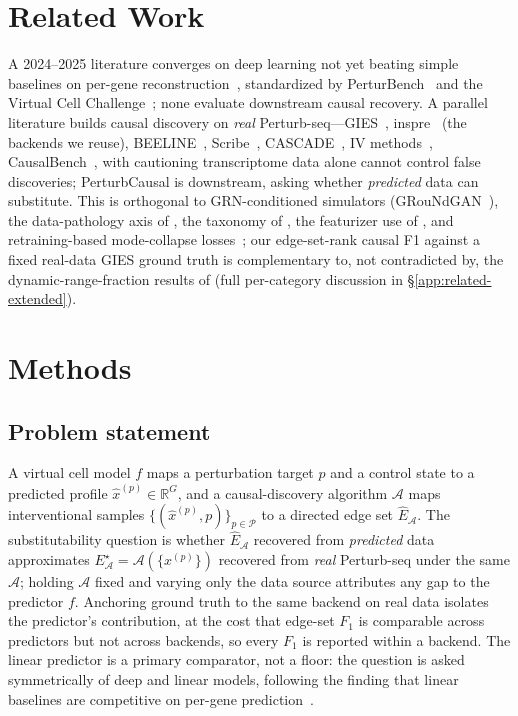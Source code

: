 \documentclass{article}
\theoremstyle{plain}
\theoremstyle{definition}
\theoremstyle{remark}
\begin{document}
\section{Related Work}
\label{sec:related}
A 2024--2025 literature converges on deep learning not yet beating simple baselines on per-gene reconstruction~\citep{ahlmanneltze2025,wong2025simple,csendes2025benchmark,wei2025benchmark,vinas2025systema,bendidi2024pca,wenteler2025perteval,zhu2025garm,li2025systematic,mejia2025diversity}, standardized by PerturBench~\citep{wu2024perturbench} and the Virtual Cell Challenge~\citep{roohani2025vcc}; none evaluate downstream causal recovery. A parallel literature builds causal discovery on \emph{real} Perturb-seq---GIES~\citep{hauser2012gies}, inspre~\citep{brown2025inspre} (the backends we reuse), BEELINE~\citep{pratapa2019beeline}, Scribe~\citep{qiu2020scribe}, CASCADE~\citep{cao2025cascade}, IV methods~\citep{park2026confounder}, CausalBench~\citep{chevalley2025causalbench}, with \citet{kernfeld2024fdr} cautioning transcriptome data alone cannot control false discoveries; PerturbCausal is downstream, asking whether \emph{predicted} data can substitute. This is orthogonal to GRN-conditioned simulators (GRouNdGAN~\citep{zinati2024groundgan}), the data-pathology axis of \citet{fernandez2026grnbreak}, the taxonomy of \citet{vc_causal_2025}, the featurizer use of \citet{wu2025cdn}, and retraining-based mode-collapse losses~\citep{mejia2025diversity}; our edge-set-rank causal F1 against a fixed real-data GIES ground truth is complementary to, not contradicted by, the dynamic-range-fraction results of \citet{miller2025calibrated} (full per-category discussion in \S\ref{app:related-extended}).

\section{Methods}
\label{sec:methods}

\subsection{Problem statement}
A virtual cell model $f$ maps a perturbation target $p$ and a control state to a predicted profile $\hat{x}^{(p)}\in\mathbb{R}^{G}$, and a causal-discovery algorithm $\mathcal{A}$ maps interventional samples $\{(\hat{x}^{(p)},p)\}_{p\in\mathcal{P}}$ to a directed edge set $\hat{E}_{\mathcal{A}}$. The substitutability question is whether $\hat{E}_{\mathcal{A}}$ recovered from \emph{predicted} data approximates $E^{\star}_{\mathcal{A}}=\mathcal{A}(\{x^{(p)}\})$ recovered from \emph{real} Perturb-seq under the same $\mathcal{A}$; holding $\mathcal{A}$ fixed and varying only the data source attributes any gap to the predictor $f$. Anchoring ground truth to the same backend on real data isolates the predictor's contribution, at the cost that edge-set $F_1$ is comparable across predictors but not across backends, so every $F_1$ is reported within a backend. The linear predictor is a primary comparator, not a floor: the question is asked symmetrically of deep and linear models, following the finding that linear baselines are competitive on per-gene prediction~\citep{ahlmanneltze2025}.
\end{document}

